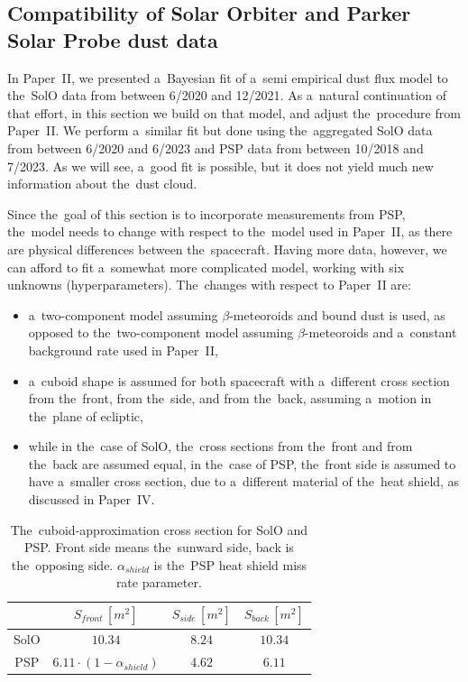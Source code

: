 \subsection{Compatibility of Solar Orbiter and Parker Solar Probe dust data}

In Paper~II, we presented a~Bayesian fit of a~semi empirical dust flux model to the~SolO data from between 6/2020 and 12/2021. As a~natural continuation of that effort, in this section we build on that model, and adjust the~procedure from Paper~II. We perform a~similar fit but done using the~aggregated SolO data from between 6/2020 and 6/2023 and PSP data from between 10/2018 and 7/2023. As we will see, a~good fit is possible, but it does not yield much new information about the~dust cloud.

Since the~goal of this section is to incorporate measurements from PSP, the~model needs to change with respect to the~model used in Paper~II, as there are physical differences between the~spacecraft. Having more data, however, we can afford to fit a~somewhat more complicated model, working with six unknowns (hyperparameters). The~changes with respect to Paper~II are:
\begin{itemize}
    \item a~two-component model assuming $\beta$-meteoroids and bound dust is used, as opposed to the~two-component model assuming $\beta$-meteoroids and a~constant background rate used in Paper~II,
    \item a~cuboid shape is assumed for both spacecraft with a~different cross section from the~front, from the~side, and from the~back, assuming a~motion in the~plane of ecliptic, 
    \item while in the~case of SolO, the~cross sections from the~front and from the~back are assumed equal, in the~case of PSP, the~front side is assumed to have a~smaller cross section, due to a~different material of the~heat shield, as discussed in Paper~IV.
\end{itemize}

\begin{table}[t]
\caption{The~cuboid-approximation cross section for SolO and PSP. Front side means the~sunward side, back is the~opposing side. $\alpha_{shield}$ is the~PSP heat shield miss rate parameter.}
\centering
\label{tab:cross_section}
\begin{tabular}{c|ccc}
\multicolumn{1}{p{1.2cm}}{  } \vline &  
\multicolumn{1}{p{3cm}}{ \centering $S_{front} \, [m^2]$ } & 
\multicolumn{1}{p{2cm}}{ \centering $S_{side} \, [m^2]$} & 
\multicolumn{1}{p{2cm}}{ \centering $S_{back} \, [m^2]$} \\
\hline
SolO & $10.34$ & $8.24$ & $10.34$   \\
PSP & $6.11 \cdot (1-\alpha_{shield})$ & $4.62$ & $6.11$  \\
\hline
\end{tabular}
\end{table}

